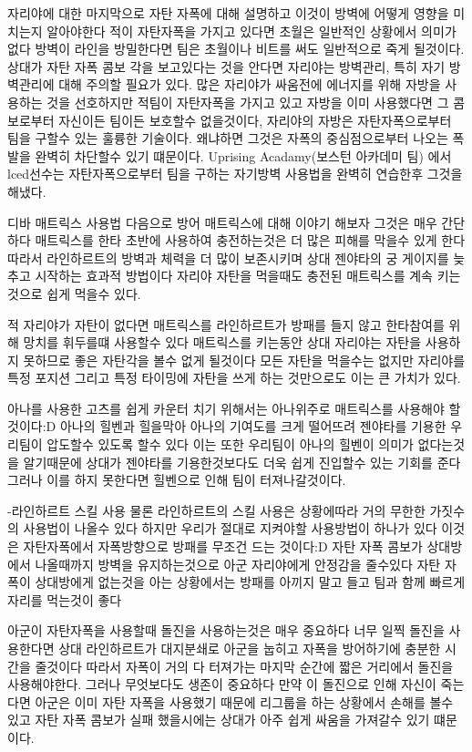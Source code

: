 자리야에 대한 마지막으로 자탄 자폭에 대해 설명하고 이것이 방벽에 어떻게 영향을 미치는지 알아야한다
적이 자탄자폭을 가지고 있다면 초월은 일반적인 상황에서 의미가 없다
방벽이 라인을 방밀한다면 팀은 초월이나 비트를 써도 일반적으로 죽게 될것이다.
상대가 자탄 자폭 콤보 각을 보고있다는 것을 안다면 자리야는 방벽관리, 특히 자기 방벽관리에 대해 주의할 필요가 있다.
많은 자리야가 싸움전에 에너지를 위해 자방을 사용하는 것을 선호하지만
적팀이 자탄자폭을 가지고 있고 자방을 이미 사용했다면 그 콤보로부터 자신이든 팀이든 보호할수 없을것이다,
자리야의 자방은 자탄자폭으로부터 팀을 구할수 있는 훌륭한 기술이다.
왜냐하면 그것은 자폭의 중심점으로부터 나오는 폭발을 완벽히 차단할수 있기 떄문이다.
Uprising Acadamy(보스턴 아카데미 팀) 에서 lced선수는 자탄자폭으로부터 팀을 구하는 자기방벽 사용법을 완벽히 연습한후 그것을 해냈다.

디바 매트릭스 사용법
다음으로 방어 매트릭스에 대해 이야기 해보자
그것은 매우 간단하다 
매트릭스를 한타 초반에 사용하여 충전하는것은 더 많은 피해를 막을수 있게 한다
따라서 라인하르트의 방벽과 체력을 더 많이 보존시키며 상대 젠야타의 궁 게이지를 늦추고 시작하는 효과적 방법이다
자리야 자탄을 먹을때도 충전된 매트릭스를 계속 키는것으로 쉽게 먹을수 있다.

적 자리야가 자탄이 없다면 매트릭스를 라인하르트가 방패를 들지 않고 한타참여를 위해 망치를 휘두를떄 사용할수 있다
매트릭스를 키는동안 상대 자리야는 자탄을 사용하지 못하므로 좋은 자탄각을 볼수 없게 될것이다 
모든 자탄을 먹을수는 없지만 자리야를 특정 포지션 그리고 특정 타이밍에 자탄을 쓰게 하는 것만으로도
이는 큰 가치가 있다.

아나를 사용한 고츠를 쉽게 카운터 치기 위해서는 아나위주로 매트릭스를 사용해야 할것이다:D
아나의 힐벤과 힐을막아 아나의 기여도를 크게 떨어뜨려 젠야타를 기용한 우리팀이 압도할수 있도록 할수 있다
이는 또한 우리팀이 아나의 힐벤이 의미가 없다는것을 알기때문에 상대가 젠야타를 기용한것보다도 더욱 쉽게 진입할수 있는 기회를 준다
그러나 이를 하지 못한다면 힐벤으로 인해 팀이 터져나갈것이다.

-라인하르트 스킬 사용
물론 라인하르트의 스킬 사용은 상황에따라 거의 무한한 가짓수의 사용법이 나올수 있다
하지만 우리가 절대로 지켜야할 사용방법이 하나가 있다 
이것은 자탄자폭에서 자폭방향으로 방패를 무조건 드는 것이다:D
자탄 자폭 콤보가 상대방에서 나올때까지 방벽을 유지하는것으로 아군 자리야에게 안정감을 줄수있다
자탄 자폭이 상대방에게 없는것을 아는 상황에서는 방패를 아끼지 말고 들고 팀과 함께 빠르게 자리를 먹는것이 좋다

아군이 자탄자폭을 사용할때 돌진을 사용하는것은 매우 중요하다 
너무 일찍 돌진을 사용한다면 상대 라인하르트가 대지분쇄로 아군을 눕히고 자폭을 방어하기에 충분한 시간을 줄것이다
따라서 자폭이 거의 다 터져가는 마지막 순간에 짧은 거리에서 돌진을 사용해야한다.
그러나 무엇보다도 생존이 중요하다
만약 이 돌진으로 인해 자신이 죽는다면 아군은 이미 자탄 자폭을 사용했기 때문에 리그룹을 하는 상황에서 손해를 볼수 있고
자탄 자폭 콤보가 실패 했을시에는 상대가 아주 쉽게 싸움을 가져갈수 있기 떄문이다.

